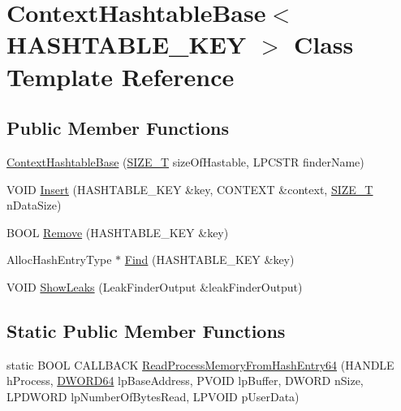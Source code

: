 \hypertarget{class_context_hashtable_base}{\section{Context\-Hashtable\-Base$<$ H\-A\-S\-H\-T\-A\-B\-L\-E\-\_\-\-K\-E\-Y $>$ Class Template Reference}
\label{class_context_hashtable_base}
}
\subsection*{Public Member Functions}
\begin{DoxyCompactItemize}
\item 
\hyperlink{class_context_hashtable_base_a0a538df8bb2ae548013d6868fbe04c92}{Context\-Hashtable\-Base} (\hyperlink{_stack_walker_8h_abf8e46e57d5b85295601cefa33de3b7a}{S\-I\-Z\-E\-\_\-\-T} size\-Of\-Hastable, L\-P\-C\-S\-T\-R finder\-Name)
\item 
V\-O\-I\-D \hyperlink{class_context_hashtable_base_abc2e1cf9c00303123157645db7f8e68f}{Insert} (H\-A\-S\-H\-T\-A\-B\-L\-E\-\_\-\-K\-E\-Y \&key, C\-O\-N\-T\-E\-X\-T \&context, \hyperlink{_stack_walker_8h_abf8e46e57d5b85295601cefa33de3b7a}{S\-I\-Z\-E\-\_\-\-T} n\-Data\-Size)
\item 
B\-O\-O\-L \hyperlink{class_context_hashtable_base_a0c6f7b1edcfb0f19ade90ec828d943cc}{Remove} (H\-A\-S\-H\-T\-A\-B\-L\-E\-\_\-\-K\-E\-Y \&key)
\item 
Alloc\-Hash\-Entry\-Type $\ast$ \hyperlink{class_context_hashtable_base_a9680426ebc8a38c85428268b54950bc5}{Find} (H\-A\-S\-H\-T\-A\-B\-L\-E\-\_\-\-K\-E\-Y \&key)
\item 
V\-O\-I\-D \hyperlink{class_context_hashtable_base_addc9bb91f1c91acbea34e166e0e51cc1}{Show\-Leaks} (Leak\-Finder\-Output \&leak\-Finder\-Output)
\end{DoxyCompactItemize}
\subsection*{Static Public Member Functions}
\begin{DoxyCompactItemize}
\item 
static B\-O\-O\-L C\-A\-L\-L\-B\-A\-C\-K \hyperlink{class_context_hashtable_base_a1648c610f37afca3fe16cd55e70b602e}{Read\-Process\-Memory\-From\-Hash\-Entry64} (H\-A\-N\-D\-L\-E h\-Process, \hyperlink{_stack_walker_8h_a97fb241c597b99bcb965858f53cacac4}{D\-W\-O\-R\-D64} lp\-Base\-Address, P\-V\-O\-I\-D lp\-Buffer, D\-W\-O\-R\-D n\-Size, L\-P\-D\-W\-O\-R\-D lp\-Number\-Of\-Bytes\-Read, L\-P\-V\-O\-I\-D p\-User\-Data)
\end{DoxyCompactItemize}
